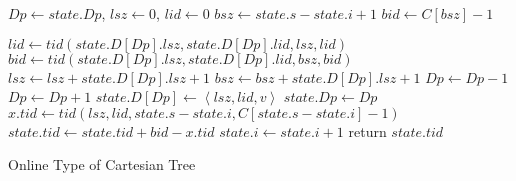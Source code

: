\begin{algorithm}[!thb]
\SetAlgoNoLine
{}

$\textit{Dp} \gets \textit{state}.\textit{Dp}$, $\textit{lsz} \gets 0$, $\textit{lid} \gets 0$ \;
$\textit{bsz} \gets \textit{state}.\textit{s} - \textit{state}.\textit{i} + 1$ \;
$\textit{bid} \gets C[\textit{bsz}] - 1$ \;

 {
  $\textit{lid} \gets \textit{tid}(\textit{state}.D[\textit{Dp}].\textit{lsz}, \textit{state}.D[\textit{Dp}].\textit{lid}, \textit{lsz}, \textit{lid})$ \;
  $\textit{bid} \gets \textit{tid}(\textit{state}.D[\textit{Dp}].\textit{lsz}, \textit{state}.D[\textit{Dp}].\textit{lid}, \textit{bsz}, \textit{bid})$ \;
  $\textit{lsz} \gets \textit{lsz} + \textit{state}.D[\textit{Dp}].\textit{lsz}+1$ \;
  $\textit{bsz} \gets \textit{bsz} + \textit{state}.D[\textit{Dp}].\textit{lsz}+1$ \;
  $\textit{Dp} \gets \textit{Dp} - 1$ \;
}
$\textit{Dp} \gets \textit{Dp} + 1$ \;
$\textit{state}.D[\textit{Dp}] \gets \left \langle \textit{lsz}, \textit{lid}, \textit{v} \right \rangle$ \;
$\textit{state}.\textit{Dp} \gets \textit{Dp}$ \;
$x.\textit{tid} \gets \textit{tid}(\textit{lsz}, \textit{lid}, \textit{state}.s-\textit{state}.i, C[\textit{state}.s-\textit{state}.i]-1)$ \;
$\textit{state}.\textit{tid} \gets \textit{state}.\textit{tid} + \textit{bid} - x.\textit{tid}$ \;
$\textit{state}.i \gets \textit{state}.i + 1$ \;
return $\textit{state}.\textit{tid}$ \;

  \caption{Online Type of Cartesian Tree}
  \label{alg:cartesian-encode-online}
\end{algorithm}